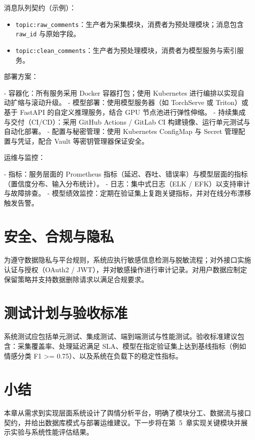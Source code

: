 消息队列契约（示例）：

\begin{itemize}
\item \texttt{topic:raw\_comments}：生产者为采集模块，消费者为预处理模块；消息包含 \texttt{raw\_id} 与原始字段。 
\item \texttt{topic:clean\_comments}：生产者为预处理模块，消费者为模型服务与索引服务。
\end{itemize}

部署方案：

- 容器化：所有服务采用 Docker 容器打包；使用 Kubernetes 进行编排以实现自动扩缩与滚动升级。 
- 模型部署：使用模型服务器（如 TorchServe 或 Triton）或基于 FastAPI 的自定义推理服务，结合 GPU 节点池进行弹性伸缩。 
- 持续集成与交付（CI/CD）：采用 GitHub Actions / GitLab CI 构建镜像、运行单元测试与自动化部署。 
- 配置与秘密管理：使用 Kubernetes ConfigMap 与 Secret 管理配置与凭证，配合 Vault 等密钥管理器保证安全。 

运维与监控：

- 指标：服务层面的 Prometheus 指标（延迟、吞吐、错误率）与模型层面的指标（置信度分布、输入分布统计）。
- 日志：集中式日志（ELK / EFK）以支持审计与故障排查。 
- 模型绩效监控：定期在验证集上复跑关键指标，并对在线分布漂移触发告警。

\section{安全、合规与隐私}
为遵守数据隐私与平台规则，系统应执行敏感信息检测与脱敏流程；对外接口实施认证与授权（OAuth2 / JWT），并对敏感操作进行审计记录。对用户数据应制定保留策略并支持数据删除请求以满足合规要求。

\section{测试计划与验收标准}
系统测试应包括单元测试、集成测试、端到端测试与性能测试。验收标准建议包含：采集覆盖率、处理延迟满足 SLA、模型在指定验证集上达到基线指标（例如情感分类 F1 >= 0.75）、以及系统在负载下的稳定性指标。

\section{小结}
本章从需求到实现层面系统设计了舆情分析平台，明确了模块分工、数据流与接口契约，并给出数据库模式与部署运维建议。下一步将在第~5~章实现关键模块并展示实验与系统性能评估结果。
